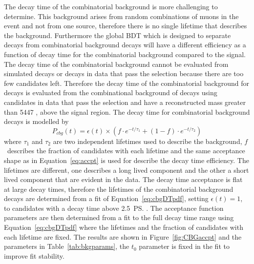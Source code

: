 The decay time \pdf of the combinatorial background is more challenging to determine. This background arises from random combinations of muons in the event and not from one source, therefore there is no single lifetime that describes the background. Furthermore the global BDT which is designed to separate \bsmumu decays from combinatorial background decays will have a different efficiency as a function of decay time for the combinatorial background compared to the \bsmum signal. The decay time \pdf of the combinatorial background cannot be evaluated from simulated decays or decays in data that pass the \bsmumu selection because there are too few candidates left. %
Therefore the decay time \pdf of the combinatorial background for \bsmumu decays is evaluated from the combinational background of \bhh decays using candidates in data that pass the \bhh selection and have a reconstructed mass greater than 5447 \mevcc, above the \bs signal region. The decay time \pdf for combinatorial background decays is modelled by
\begin{equation}
P_{cbg}(t) = \epsilon(t)\times \left( f \cdot e^{-t/\tau_{1}} + (1-f)\cdot e^{-t/\tau_{2}} \right)
\label{eq:cbgDTpdf}
\end{equation}
where $\tau_{1}$ and $\tau_{2}$ are two independent lifetimes used to describe the background, $f$~describes the fraction of candidates with each lifetime and the same acceptance shape as in Equation~\ref{eq:accpt} is used for describe the decay time efficiency. The lifetimes are different, one describes a long lived component and the other a short lived component that are evident in the data. The decay time acceptance is flat at large decay times, therefore the lifetimes of the combinatorial background decays are determined from a \ml fit of Equation~\ref{eq:cbgDTpdf}, setting $\epsilon(t)=1$, to candidates with a decay time above 2.5~\ps. The acceptance function parameters are then determined from a \ml fit to the full decay time range using Equation~\ref{eq:cbgDTpdf} where the lifetimes and the fraction of candidates with each lifetime are fixed. The results are shown in Figure~\ref{fig:CBGaccpt} and the \pdf parameters in Table~\ref{tab:bkgparams}, the $t_{0}$ parameter is fixed in the fit to improve fit stability. 
